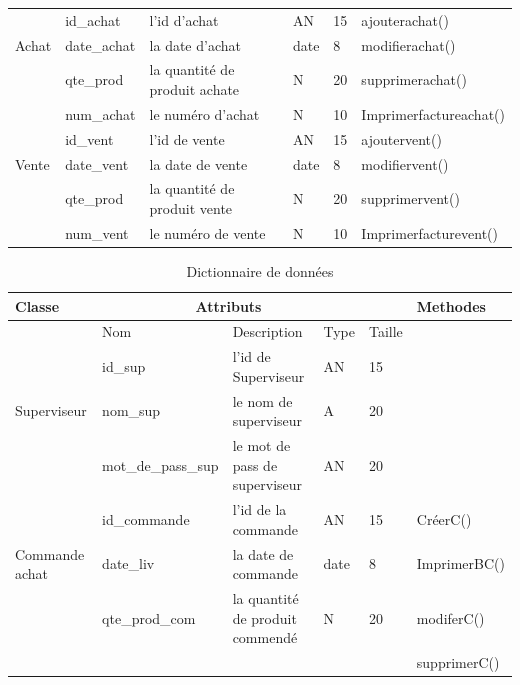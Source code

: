 \documentclass[edit,12pt,a4paper,ChapStyle,oneside,doubleinterligne]{report}
\begin{document}
\begin{table}[H]
\begin{tabular}{ | m{} | m{}| m{3cm} |m{}|m{}|l|}
                    &id\_achat  &l'id d'achat&AN&15&ajouterachat()\\\cline{2-5}
    Achat           &date\_achat&la date d'achat&date&8&modifierachat()\\\cline{2-5}
                    &qte\_prod  &la quantité de produit achate&N&20&supprimerachat()\\\cline{2-5}
                    &num\_achat &le numéro d'achat            &N&10&Imprimerfactureachat()\\\hline

                    &id\_vent  &l'id de vente&AN&15&ajoutervent()\\\cline{2-5}
    Vente            &date\_vent &la date de vente&date&8&modifiervent()\\\cline{2-5}
                    &qte\_prod  &la quantité de produit vente&N&20&supprimervent()\\\cline{2-5}
                    &num\_vent &le numéro de vente            &N&10&Imprimerfacturevent()\\\hline
                    

                    
 \end{tabular}
 
\end{table}
\begin{table}[H]
    \centering
    \begin{tabular}{ | m{} | m{}| m{3cm} |m{}|m{}|l|}
    \hline
         Classe&\multicolumn{3}{c}{Attributs}&\phantom{h} &Methodes\\
         \hline       &Nom&Description&Type&Taille&\\\cline{2-5}
                      &id\_sup&l'id de Superviseur&AN&15& \\\cline{2-5}
         Superviseur  &nom\_sup&le nom de superviseur&A&20& \\\cline{2-5}
                      &mot\_de\_pass\_sup&le mot de pass de superviseur &AN&20& \\\hline
                      

                                          
                    
                    &id\_commande &l'id de la commande&AN&15& CréerC()\\\cline{2-5}
    Commande achat  &date\_liv &la date de commande&date&8&ImprimerBC()\\\cline{2-5}
                    &qte\_prod\_com&la quantité de produit commendé&N&20&modiferC()\\\cline{2-5}
                    &              &                               & &  &supprimerC()\\\hline

                

 \end{tabular}
 \caption{Dictionnaire de données}
\label{tab:Dictionnaire}
\end{table}
\end{document}
